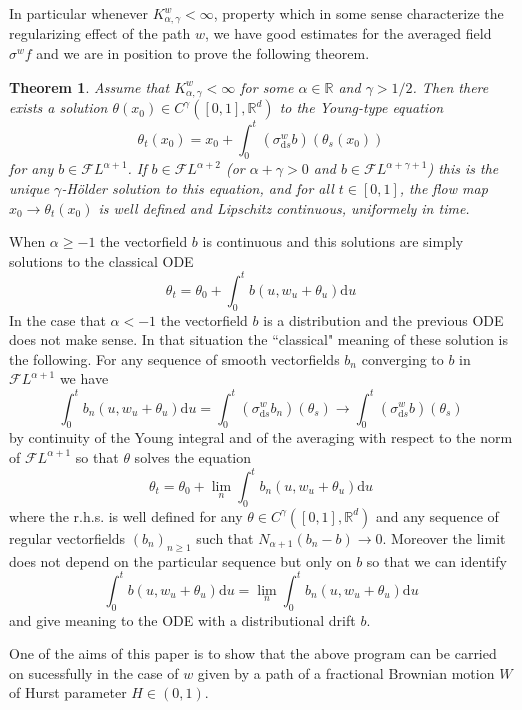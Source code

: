 \documentclass[11pt,a4paper,draft,reqno]{amsart}
\newtheorem{theorem}{Theorem}
\theoremstyle{definition}
\newcommand{\RR}{\mathbb{R}}
\newcommand{\cF}{\mathcal{F}}
\newcommand{\dd}{\mathrm{d}}
\begin{document}
In particular whenever $K^w_{\alpha,\gamma} < \infty$, property which in some sense characterize the regularizing effect of the path $w$, we have good estimates for the averaged field $\sigma^w f$ and we are in position to prove the following theorem.

\begin{theorem}
Assume that $K^w_{\alpha,\gamma} < \infty$ for some $\alpha \in \RR$ and $\gamma > 1/2$. Then there exists a solution $\theta(x_0)\in C^\gamma([0,1],\RR^d)$ to the Young-type equation 
$$
\theta_t(x_0) = x_0 + \int_0^t (\sigma^w_{\dd s} b)(\theta_s(x_0))
$$
for any $b\in \cF L^{\alpha+1}$. If $b\in \cF L^{\alpha+2}$ (or $\alpha+\gamma>0$ and $b\in\cF L^{\alpha+\gamma+1}$) this is the unique $\gamma$-H\"older solution to this equation, and for all $t\in[0,1]$, the flow map $x_0\to\theta_t(x_0)$ is well defined and Lipschitz continuous, uniformely in time. 
\end{theorem}

When $\alpha \ge -1$ the vectorfield $b$ is continuous and this solutions are simply solutions to the classical ODE
$$
\theta_t = \theta_0 + \int_0^t b(u,w_u+\theta_u) \dd u
$$
In the case that $\alpha < -1$ the vectorfield $b$ is a distribution and the previous ODE does not make sense. In that situation the ``classical" meaning of these solution is the following. For any sequence of smooth vectorfields $b_n$ converging to $b$ in $\cF L^{\alpha+1}$ we have
$$
\int_0^t b_n(u,w_u+\theta_u) \dd u = \int_0^t (\sigma^w_{\dd s} b_n)(\theta_s) \to \int_0^t (\sigma^w_{\dd s} b)(\theta_s)
$$
by continuity of the Young integral and of the averaging with respect to the norm of $\cF L^{\alpha+1}$ so that $\theta$ solves the equation
$$
\theta_t = \theta_0 + \lim_n \int_0^t b_n(u,w_u+\theta_u) \dd u 
$$
where the r.h.s. is well defined for any $\theta\in C^\gamma([0,1],\RR^d)$ and any sequence of regular vectorfields $(b_n)_{n\ge 1}$ such that $N_{\alpha+1}(b_n -b)\to 0$. Moreover the limit does not depend on the particular sequence but only on $b$ so that we can identify
$$
\int_0^t b(u,w_u+\theta_u) \dd u =  \lim_n \int_0^t b_n(u,w_u+\theta_u) \dd u 
$$
and give meaning to the ODE with a distributional drift $b$. 
  
  \bigskip
One of the  aims of this paper is to show that the above program can be carried on sucessfully in the case of $w$ given by a path of a fractional Brownian motion $W$ of Hurst parameter $H\in (0,1)$.

\end{document}
